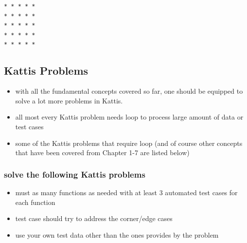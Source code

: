 \documentclass[11pt]{article}
\providecommand{\tightlist}{%
      \setlength{\itemsep}{0pt}\setlength{\parskip}{0pt}}
\begin{document}
\begin{verbatim}
* * * * *
* * * * *
* * * * *
* * * * * 
* * * * *
\end{verbatim}

    \hypertarget{kattis-problems}{%
\subsection{Kattis Problems}\label{kattis-problems}}

\begin{itemize}
\tightlist
\item
  with all the fundamental concepts covered so far, one should be
  equipped to solve a lot more problems in Kattis.
\item
  all most every Kattis problem needs loop to process large amount of
  data or test cases
\item
  some of the Kattis problems that require loop (and of course other
  concepts that have been covered from Chapter 1-7 are listed below)
\end{itemize}

\hypertarget{solve-the-following-kattis-problems}{%
\subsubsection{solve the following Kattis
problems}\label{solve-the-following-kattis-problems}}

\begin{itemize}
\tightlist
\item
  must as many functions as needed with at least 3 automated test cases
  for each function
\item
  test case should try to address the corner/edge cases
\item
  use your own test data other than the ones provides by the problem
\end{itemize}
\end{document}

